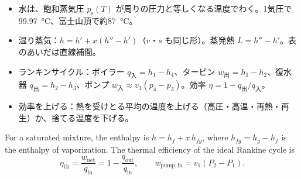 \begin{taisetsu}
\begin{itemize}[leftmargin=1.2\zw, itemsep=2pt, topsep=0pt, label={\color{bkNavy}●}]
\item 水は、飽和蒸気圧 $p_{\mathrm s}(T)$ が周りの圧力と等しくなる温度でわく。1気圧で\qty{99.97}{\celsius}、富士山頂で約\qty{87}{\celsius}。
\item 湿り蒸気：$h=h'+x(h''-h')$（$v$・$s$ も同じ形）。蒸発熱 $L=h''-h'$。表のあいだは直線補間。
\item ランキンサイクル：ボイラー $q_{\text{入}}=h_1-h_4$、タービン $w_{\text{出}}=h_1-h_2$、復水器 $q_{\text{出}}=h_2-h_3$、ポンプ $w_{\text{入}}\approx v_3(p_4-p_3)$。効率 $\eta=1-q_{\text{出}}/q_{\text{入}}$。
\item 効率を上げる：熱を受けとる平均の温度を上げる（高圧・高温・再熱・再生）か、捨てる温度を下げる。
\end{itemize}
\end{taisetsu}

\begin{kotoba}\small
{}
\end{kotoba}

\begin{senmonsho}
\begin{bkhonbun}
For a saturated mixture, the enthalpy is $h=h_f+x\,h_{fg}$, where $h_{fg}=h_g-h_f$ is the enthalpy of vaporization. The thermal efficiency of the ideal Rankine cycle is
\[ \eta_{\mathrm{th}}=\frac{w_{\mathrm{net}}}{q_{\mathrm{in}}}=1-\frac{q_{\mathrm{out}}}{q_{\mathrm{in}}},\qquad w_{\mathrm{pump,in}}=v_1(P_2-P_1). \]
\end{bkhonbun}
\end{senmonsho}

